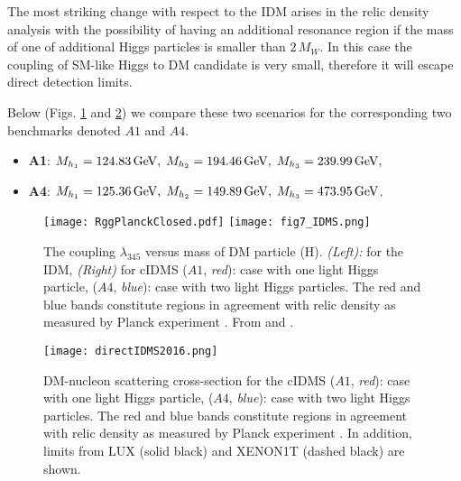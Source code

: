 \documentclass{PoS}
\newcommand{\GeV}{{\ensuremath\rm GeV}}
\newcommand{\g}{{\ensuremath\rm GeV}}
\begin{document}
{The most striking change with respect to the IDM arises in the relic density analysis with the possibility 
of having an additional resonance region if the mass of one of additional Higgs particles is smaller than $2\,M_W$. In this case the coupling of SM-like Higgs to DM candidate is very small, therefore it will escape direct detection limits. 

{{ Below (Figs. \ref{fig:idm-idms} and \ref{fig:idmsdet}) we compare these two scenarios for the corresponding two benchmarks denoted  $A1$ and $A4$.
  \begin{itemize}
\item \textrm{\textbf{A1}: }\;$ M_{h_1} = 124.83\,\GeV, \; M_{h_2} = 194.46\,\GeV, \;
M_{h_3} = 239.99\,\GeV, $ 
\item \textrm{\textbf{A4}: }\; $M_{h_1} = 125.36\,\GeV, \; M_{h_2} = 149.89\,\GeV, \;
M_{h_3} = 473.95\,\GeV$.
\end{itemize}}}


\begin{figure}[ht]
\begin{center}
\texttt{[image: RggPlanckClosed.pdf]}
\texttt{[image: fig7\_IDMS.png]}
\caption{\label{fig:idm-idms}  The coupling  $\lambda_{345}$ versus mass of DM particle (H).
{{\sl (Left):}} for the IDM, {{\sl (Right)}} for
cIDMS ($A1$, {\sl red}): case with one light Higgs particle, ($A4$, {\sl blue}): case with
two light Higgs particles. {The red and blue bands constitute regions in agreement with relic density as measured by Planck experiment \cite{Planck:2015xua}}. From \cite{Krawczyk:2015vka} and \cite{Krawczyk:2015xhl}.}
\end{center}
\end{figure}

\begin{figure}[h!]
\begin{center}
\texttt{[image: directIDMS2016.png]}
\caption{\label{fig:idmsdet} DM-nucleon scattering cross-section for the
cIDMS ($A1$, {\sl red}): case with one light Higgs particle, ($A4$, {\sl blue}): case with
two light Higgs particles. {The red and blue bands constitute regions in agreement with relic density as measured by Planck experiment \cite{Planck:2015xua}}. {In addition,} limits from LUX \cite{Akerib:2016vxi} (solid
black) and XENON1T \cite{Aprile:2012zx} (dashed black) are shown. }
\end{center}
\end{figure}


}
\end{document}
